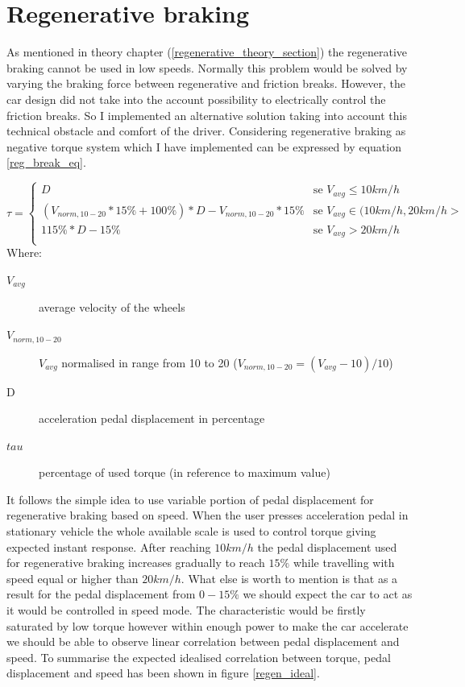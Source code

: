 \section{Regenerative braking}
As mentioned in theory chapter (\ref{regenerative_theory_section}) the regenerative braking cannot be used in low speeds. Normally this problem would be solved by varying the braking force between regenerative and friction breaks. However, the car design did not take into the account possibility to electrically control the friction breaks. So I implemented an alternative solution taking into account this technical obstacle and comfort of the driver.
Considering regenerative braking as negative torque system which I have implemented can be expressed by equation \ref{reg_break_eq}.


\begin{equation*}
    \tau = \begin{cases}
        D & \text{se $V_{avg} \leq 10km/h$}\\
        (V_{norm,10-20} * 15\% + 100\%) * D - V_{norm,10-20} * 15\% & \text{se $V_{avg} \in (10km/h,20km/h>$}\\
        115\% * D - 15\% & \text{se $V_{avg} > 20km/h$}\\
    \end{cases}
    \label{reg_break_eq}
\end{equation*}
Where:
\begin{description}
    \item[$V_{avg}$] average velocity of the wheels 
    \item[$V_{norm,10-20}$] $V_{avg}$ normalised in range from 10 to 20 ($V_{norm,10-20}=(V_{avg}-10)/10$)
    \item[D] acceleration pedal displacement in percentage
    \item[$tau$] percentage of used torque (in reference to maximum value)
\end{description}

It follows the simple idea to use variable portion of pedal displacement for regenerative braking based on speed.
When the user presses acceleration pedal in stationary vehicle the whole available scale is used to control torque giving expected instant response. After reaching $10km/h$ the pedal  displacement used for regenerative braking increases gradually to reach $15\%$ while travelling with speed equal or higher than $20km/h$.
What else is worth to mention is that as a result for the pedal displacement from $0-15\%$ we should expect the car to act as it would be controlled in speed mode.\label{speed_mode} The characteristic would be firstly saturated by low torque however within enough power to make the car accelerate we should be able to observe linear correlation between pedal displacement and speed.
To summarise the expected idealised correlation between torque, pedal displacement and speed has been shown in figure \ref{regen_ideal}.

